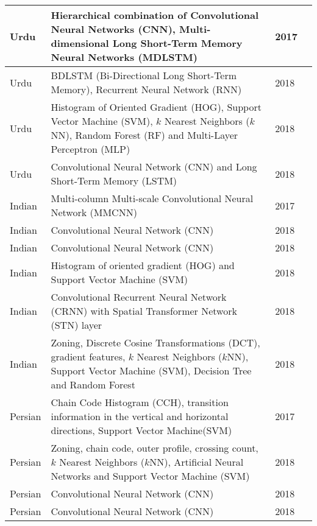 \documentclass{article}
\begin{document}
\begin{landscape}
\begin{longtable}{| p{1.5cm} | p{16cm}| p{1.5cm}| p{1cm}|}
Urdu & Hierarchical combination of Convolutional Neural Networks (CNN),  Multi-dimensional Long Short-Term Memory Neural Networks (MDLSTM)  & 2017 & \cite{naz2017urdu}\\ \hline
Urdu & BDLSTM (Bi-Directional Long Short-Term Memory),  Recurrent Neural Network (RNN) & 2018 & \cite{tayyab2018multi}\\ \hline
Urdu & Histogram of Oriented Gradient (HOG), Support Vector Machine (SVM), $k$ Nearest Neighbors ($k$NN), Random Forest (RF) and Multi-Layer Perceptron (MLP) & 2018 & \cite{chandio2018character}\\ \hline
Urdu & Convolutional Neural Network (CNN) and Long Short-Term Memory (LSTM) & 2018 & \cite{naseer2018comparative}\\ \hline






Indian &  Multi-column Multi-scale Convolutional Neural Network (MMCNN)   &2017 &\cite{sarkhel2017multi}\\ \hline
Indian & Convolutional Neural Network (CNN) & 2018 & \cite{rabby2018bornonet}\\ \hline
Indian & Convolutional Neural Network (CNN) & 2018 & \cite{avadesh2018optical}\\ \hline
Indian & Histogram of oriented gradient (HOG) and Support Vector Machine (SVM) & 2018 & \cite{choudhury2018handwritten}\\ \hline
Indian & Convolutional Recurrent Neural Network (CRNN) with Spatial Transformer Network (STN) layer & 2018 & \cite{dutta2017towards}\\ \hline
Indian & Zoning, Discrete Cosine Transformations (DCT), gradient features, $k$ Nearest Neighbors ($k$NN), Support Vector Machine (SVM), Decision Tree and Random Forest & 2018 & \cite{kumar2018improved}\\ \hline



Persian & Chain Code Histogram (CCH), transition information in the vertical and horizontal directions,  Support Vector Machine(SVM) & 2017 & \cite{boukharouba2017novel}\\ \hline




Persian & Zoning, chain code, outer profile, crossing count, $k$ Nearest Neighbors ($k$NN), Artificial Neural Networks and Support Vector Machine (SVM) & 2018 & \cite{akbari2018novel}\\ \hline
Persian & Convolutional Neural Network (CNN) & 2018 & \cite{sarvaramini2018persian}\\ \hline
Persian & Convolutional Neural Network (CNN) & 2018 & \cite{ghasemi2018persian}\\ \hline




\end{longtable}
\end{landscape}
\end{document}

